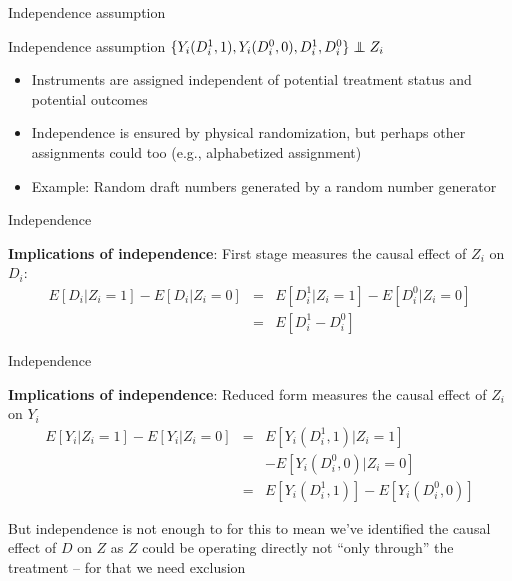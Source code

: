 \documentclass{beamer}
\newcommand\independent{\protect\mathpalette{\protect\independenT}{\perp}}
\def\independenT#1#2{\mathrel{\rlap{$#1#2$}\mkern2mu{#1#2}}}
\begin{document}
		


\begin{frame}{Independence assumption}
	
	\begin{block}{Independence assumption}
	$\{Y_i(D^1_i,1),Y_i(D^0_i,0),D^1_{i},D^{0}_i\} \independent{Z}_i$
	\end{block}

\begin{itemize}	
\item Instruments are assigned independent of potential treatment status and potential outcomes
\item Independence is ensured by physical randomization, but perhaps other assignments could too (e.g., alphabetized assignment)
\item Example: Random draft numbers generated by a random number generator
\end{itemize}

\end{frame}


\begin{frame}{Independence}

		 \textbf{Implications of independence}: First stage measures the causal effect of $Z_i$ on $D_i$:
			\begin{eqnarray*}
			E[D_i|Z_i=1] - E[D_i|Z_i=0] &=& E[D^1_{i} | Z_i = 1] - E[D^0_{i}|Z_i = 0] \\
			&=& E[D^1_{i} - D^0_{i}]
			\end{eqnarray*}

\end{frame}

\begin{frame}{Independence}

			 \textbf{Implications of independence}: Reduced form measures the causal effect of $Z_i$ on $Y_i$
			\begin{eqnarray*}
			E[Y_i | Z_i=1] - E[Y_i | Z_i=0] &=& E[Y_i(D^1_{i},1)|Z_i = 1] \\
			&& - E[Y_i(D^0_{i},0) | Z_i = 0] \\
			&=&E[Y_i(D^1_{i},1)] - E[Y_i(D^0_{i},0)]
			\end{eqnarray*}
			
			\bigskip
			
			But independence is not enough to for this to mean we've identified the causal effect of $D$ on $Z$ as $Z$ could be operating directly not ``only through'' the treatment -- for that we need exclusion
\end{frame}
\end{document}
